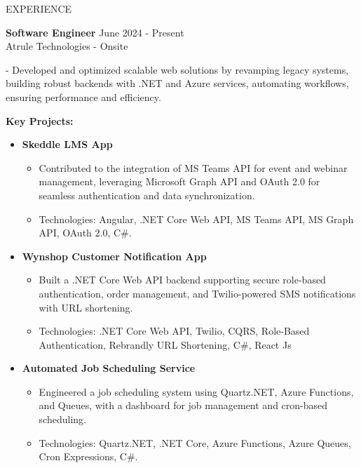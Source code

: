 \documentclass{resume} %
\begin{document}


\begin{rSection}{EXPERIENCE}
	
	\textbf{Software Engineer} \hfill June 2024 - Present\\
	Atrule Technologies - Onsite %
		\itemsep 1pt {} 
				
		\item - Developed and optimized scalable web solutions by revamping legacy systems, building robust backends with .NET and Azure services, automating workflows, ensuring performance and efficiency.
		
		
		\textbf{Key Projects:}
		\begin{itemize}
			\itemsep -5pt {} 
			\item \textbf {Skeddle LMS App} 
			\begin{itemize}
				\itemsep -5pt {} 
				\item Contributed to the integration of MS Teams API for event and webinar management, leveraging Microsoft Graph API and OAuth 2.0 for seamless authentication and data synchronization.
				\item Technologies: Angular, .NET Core Web API, MS Teams API, MS Graph API, OAuth 2.0, C\#.
			\end{itemize}
			\item \textbf {Wynshop Customer Notification App} 
			\begin{itemize}
				\itemsep -5pt {} 
				\item Built a .NET Core Web API backend supporting secure role-based authentication, order management, and Twilio-powered SMS notifications with URL shortening.
				\item Technologies: .NET Core Web API, Twilio, CQRS, Role-Based Authentication, Rebrandly URL Shortening, C\#, React Js
			\end{itemize}
			\item \textbf {Automated Job Scheduling Service} 
			\begin{itemize}
				\itemsep -5pt {} 
				\item Engineered a job scheduling system using Quartz.NET, Azure Functions, and Queues, with a dashboard for job management and cron-based scheduling.			
				\item Technologies: Quartz.NET, .NET Core, Azure Functions, Azure Queues, Cron Expressions, C\#.  
			\end{itemize}
		\end{itemize}
		

\end{rSection}
\end{document}
